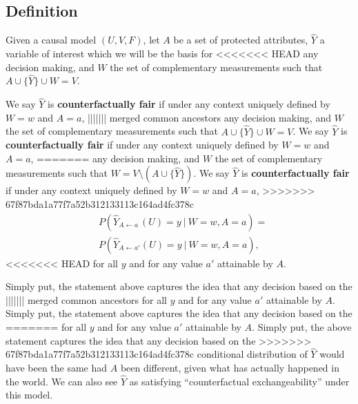 \subsection{Definition}
Given a causal model $(U, V, F)$, let $A$ be a set of protected
attributes, $\hat Y$ a variable of interest which we will be the basis for
<<<<<<< HEAD
any decision making, and $W$ the set of complementary measurements such that $A
\cup \{\hat Y\} \cup W = V$.
\begin{define}
We say $\hat Y$ is {\bf counterfactually fair}
if under any context uniquely defined by $W = w$ and $A = a$,
||||||| merged common ancestors
any decision making, and $W$ the set of complementary measurements such that $A
\cup \{\hat Y\} \cup W = V$. We say $\hat Y$ is {\bf
  counterfactually fair} if under any context uniquely defined by $W = w$ and $A = a$,
=======
any decision making, and $W$ the set of complementary measurements such that $W= V \setminus ( A \cup \{\hat Y\})$. We say $\hat Y$ is {\bf
  counterfactually fair} if under any context uniquely defined by $W = w$ and $A = a$,
>>>>>>> 67f87bda1a77f7a52b312133113c164ad4fc378c
\begin{align}
  \label{eq:cf_definition}
  &P(\hat Y_{A \leftarrow a\ }(U) = y\ |\ W = w, A = a)  =\nonumber\\ 
  &P(\hat Y_{A \leftarrow a'}(U) = y\ |\ W = w, A = a), 
\end{align}
<<<<<<< HEAD
for all $y$ and for any value $a'$ attainable by $A$.
\end{define}
Simply put,
the statement above captures the idea that any decision based on the
||||||| merged common ancestors
%
for all $y$ and for any value $a'$ attainable by $A$. Simply put,
the statement above captures the idea that any decision based on the
=======
%
for all $y$ and for any value $a'$ attainable by $A$. Simply put,
the above statement captures the idea that any decision based on the
>>>>>>> 67f87bda1a77f7a52b312133113c164ad4fc378c
conditional distribution of $\hat Y$ would have been the same had $A$ been
different, given what has actually happened in the world.
We can also see $\hat Y$ as satisfying ``counterfactual exchangeability''
under this model.

